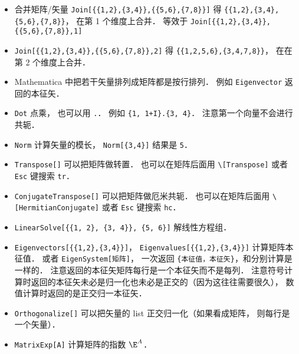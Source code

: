 \begin{itemize}
\item 合并矩阵/矢量 \verb|Join[{{1,2},{3,4}},{{5,6},{7,8}}]| 得 \verb|{{1,2},{3,4},{5,6},{7,8}}|， 在第 1 个维度上合并． 等效于 \verb|Join[{{1,2},{3,4}},{{5,6},{7,8}},1]|
\item \verb|Join[{{1,2},{3,4}},{{5,6},{7,8}},2]| 得 \verb|{{1,2,5,6},{3,4,7,8}}|， 在在第 2 个维度上合并．
\item Mathematica 中把若干矢量排列成矩阵都是按行排列． 例如 \verb|Eigenvector| 返回的本征矢．
\item \verb|Dot| 点乘， 也可以用 \verb|.|． 例如 \verb|{1, 1+I}.{3, 4}|． 注意第一个向量不会进行共轭．
\item \verb|Norm| 计算矢量的模长， \verb|Norm[{3,4}]| 结果是 \verb|5|．
\item \verb|Transpose[]| 可以把矩阵做转置． 也可以在矩阵后面用 \verb|\[Transpose]| 或者 \verb|Esc| 键搜索 \verb|tr|．
\item \verb|ConjugateTranspose[]| 可以把矩阵做厄米共轭． 也可以在矩阵后面用 \verb|\[HermitianConjugate]| 或者 \verb|Esc| 键搜索 \verb|hc|．
\item \verb|LinearSolve[{{1, 2}, {3, 4}}, {5, 6}]| 解线性方程组．
\item \verb|Eigenvectors[{{1,2},{3,4}}]|， \verb|Eigenvalues[{{1,2},{3,4}}]| 计算矩阵本征值． 或者 \verb|EigenSystem[矩阵]|， 一次返回 \verb|{本征值，本征矢}|，和分别计算是一样的． 注意返回的本征矢矩阵每行是一个本征矢而不是每列． 注意符号计算时返回的本征矢未必是归一化也未必是正交的（因为这往往需要很久）， 数值计算时返回的是正交归一本征矢．
\item \verb|Orthogonalize[]| 可以把矢量的 list 正交归一化（如果看成矩阵， 则每行是一个矢量）．
\item \verb|MatrixExp[A]| 计算矩阵的指数 $\E^{A}$．
\end{itemize}


